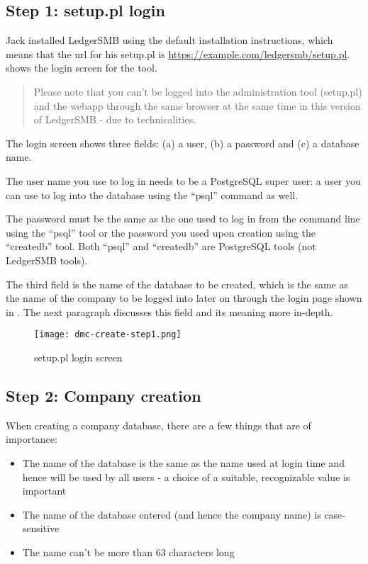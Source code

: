 \subsection{Step 1: setup.pl login}

Jack installed LedgerSMB using the default installation instructions, which means
that the url for his setup.pl is \url{https://example.com/ledgersmb/setup.pl}.
 shows the login screen for the tool.

\begin{quotation}
Please note that you can't be logged into the administration tool (setup.pl) and the webapp
through the same browser at the same time in this version of LedgerSMB - due to technicalities.
\end{quotation}

The login screen shows three fields: (a) a user, (b) a password and (c) a database name.

The user name you use to log in needs to be a PostgreSQL super user: a user you can use
to log into the database using the ``psql'' command as well.

The password must be the same as the one used to log in from the command line using the
``psql'' tool or the password you used upon creation using the ``createdb'' tool. Both
``psql'' and ``createdb'' are PostgreSQL tools (not LedgerSMB tools).

The third field is the name of the database to be created, which is the same as the
name of the company to be logged into later on through the login page shown in . The next paragraph discusses this field and its meaning more
in-depth.

\begin{figure}[h]
\centering
\texttt{[image: dmc-create-step1.png]}
\caption{setup.pl login screen}
\label{fig:setup-step1}
\end{figure}

\subsection{Step 2: Company creation}

When creating a company database, there are a few things that are of importance:

\begin{itemize}
\item The name of the database is the same as the name used at login time and hence
   will be used by all users - a choice of a suitable, recognizable value is important
\item The name of the database entered (and hence the company name) is case-sensitive
\item The name can't be more than 63 characters long
\end{itemize}


